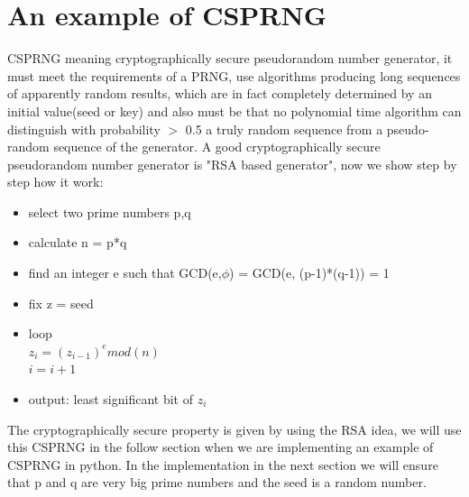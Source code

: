 \documentclass{article}
\begin{document}
\section{An example of CSPRNG}
CSPRNG meaning cryptographically secure pseudorandom number generator, it must meet the requirements of a PRNG, use algorithms producing long sequences of apparently random results, which are in fact completely determined by an initial value(seed or key) and also must be that no polynomial time algorithm can distinguish with probability \begin{math}>\end{math} 0.5 a truly random sequence from a pseudo-random sequence of the generator. A good cryptographically secure pseudorandom number generator is "RSA based generator", now we show step by step how it work:
\begin{itemize}
  \item select two prime numbers p,q
  \item calculate n = p*q
  \item find an integer e such that GCD(e,\begin{math}\phi\end{math}) = GCD(e, (p-1)*(q-1)) = 1
  \item fix z = seed
  \item loop\\\begin{math}z_i = (z_{i-1})^{e} mod(n)\end{math}\\\begin{math}i = i + 1\end{math}
  \item output: least significant bit of \begin{math}z_i\end{math}
\end{itemize}
The cryptographically secure property is given by using the RSA idea, we will use this CSPRNG in the follow section when we are implementing an example of CSPRNG in python. In the implementation in the next section we will ensure that p and q are very big prime numbers and the seed is a random number.
\end{document}

